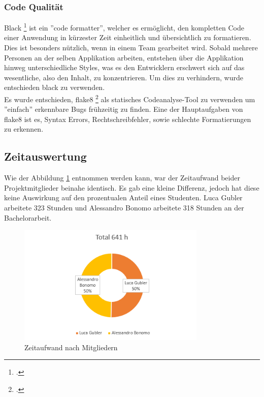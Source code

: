 \subsubsection*{Code Qualität}
Black \footcite{black} ist ein ''code formatter'', welcher es ermöglicht, den kompletten Code einer Anwendung in kürzester Zeit einheitlich und übersichtlich zu formatieren. Dies ist besonders nützlich, wenn in einem Team gearbeitet wird. Sobald mehrere Personen an der selben Applikation arbeiten, entstehen über die Applikation hinweg unterschiedliche Styles, was es den Entwicklern erschwert sich auf das wesentliche, also den Inhalt, zu konzentrieren. Um dies zu verhindern, wurde entschieden black zu verwenden. \\

Es wurde entschieden, flake8 \footcite{flake8} als statisches Codeanalyse-Tool zu verwenden um ''einfach'' erkennbare Bugs frühzeitig zu finden. Eine der Hauptaufgaben von flake8 ist es, Syntax Errors, Rechtschreibfehler, sowie schlechte Formatierungen zu erkennen.


\newpage


\subsection{Zeitauswertung}
Wie der Abbildung \ref{time_per_student} entnommen werden kann, war der Zeitaufwand beider Projektmitglieder beinahe identisch. Es gab eine kleine Differenz, jedoch hat diese keine Auswirkung auf den prozentualen Anteil eines Studenten. Luca Gubler arbeitete 323 Stunden und Alessandro Bonomo arbeitete 318 Stunden an der Bachelorarbeit.

	\begin{figure}[H]
	\begin{center}
	
		\includegraphics[width=0.8\textwidth, height=\textheight, keepaspectratio]{images/Zeitauswertung/Arbeitsaufwand_Personen.png}
		\caption{Zeitaufwand nach Mitgliedern}
		\label{time_per_student}
		\end{center}
\end{figure}

